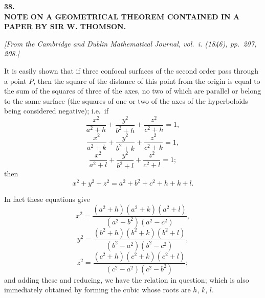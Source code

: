 \documentclass[11pt]{article}
\begin{document}
\begin{center}
{\Large\bfseries 38.}\\[1em]
{\large\bfseries NOTE ON A GEOMETRICAL THEOREM CONTAINED IN A\\PAPER BY SIR W. THOMSON.}
\end{center}

\bigskip
\textit{[From the Cambridge and Dublin Mathematical Journal, vol.~i. (1846), pp.~207, 208.]}

\bigskip

It is easily shown that if three confocal surfaces of the second order pass through a point $P$, then the square of the distance of this point from the origin is equal to the sum of the squares of three of the axes, no two of which are parallel or belong to the same surface (the squares of one or two of the axes of the hyperboloids being considered negative); i.e.\ if
\[
\frac{x^2}{a^2 + h} + \frac{y^2}{b^2 + h} + \frac{z^2}{c^2 + h} = 1,
\]
\[
\frac{x^2}{a^2 + k} + \frac{y^2}{b^2 + k} + \frac{z^2}{c^2 + k} = 1,
\]
\[
\frac{x^2}{a^2 + l} + \frac{y^2}{b^2 + l} + \frac{z^2}{c^2 + l} = 1;
\]
then
\[
x^2 + y^2 + z^2 = a^2 + b^2 + c^2 + h + k + l.
\]

In fact these equations give
\[
x^2 = \frac{(a^2 + h)(a^2 + k)(a^2 + l)}{(a^2 - b^2)(a^2 - c^2)},
\]
\[
y^2 = \frac{(b^2 + h)(b^2 + k)(b^2 + l)}{(b^2 - a^2)(b^2 - c^2)},
\]
\[
z^2 = \frac{(c^2 + h)(c^2 + k)(c^2 + l)}{(c^2 - a^2)(c^2 - b^2)};
\]
and adding these and reducing, we have the relation in question; which is also immediately obtained by forming the cubic whose roots are $h$, $k$, $l$.
\end{document}
